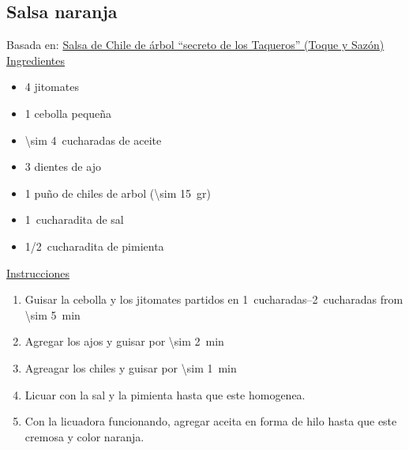 \subsection{Salsa naranja}

Basada en: \href{https://www.youtube.com/watch?v=k9JAnBb19W8}{Salsa de Chile de árbol “secreto de los Taqueros” (Toque y Sazón)}\\

\underline{Ingredientes}
\begin{itemize}
\item 4 jitomates
\item 1 cebolla pequeña
\item \SI{\sim 4}{cucharadas} de aceite
\item 3 dientes de ajo
\item 1 puño de chiles de arbol (\SI{\sim 15}{gr})
\item \SI{1}{cucharadita} de sal
\item \SI{1/2}{cucharadita} de pimienta
\end{itemize}

\underline{Instrucciones}
\begin{enumerate}
\item Guisar la cebolla y los jitomates partidos  en \SIrange{1}{2}{cucharadas} from \SI{\sim 5}{min}
\item Agregar los ajos y guisar por \SI{\sim 2}{min}
\item Agreagar los chiles y guisar por  \SI{\sim 1}{min}
\item Licuar con la sal y la pimienta hasta que este homogenea.
\item Con la licuadora funcionando, agregar aceita en forma de hilo hasta que este cremosa y color naranja.
\end{enumerate}